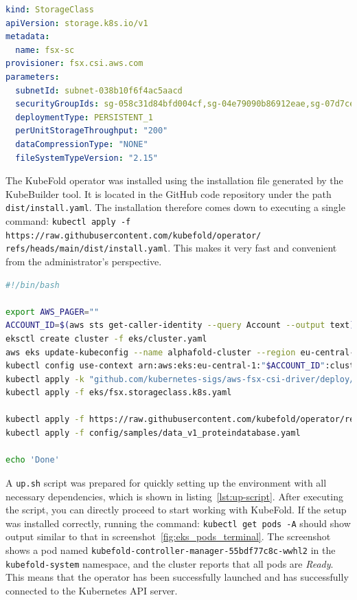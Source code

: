 \begin{lstlisting}[language=yaml,caption={Definition of \texttt{StorageClass} for FSx CSI Driver},label={lst:storage-class}]
kind: StorageClass
apiVersion: storage.k8s.io/v1
metadata:
  name: fsx-sc
provisioner: fsx.csi.aws.com
parameters:
  subnetId: subnet-038b10f6f4ac5aacd
  securityGroupIds: sg-058c31d84bfd004cf,sg-04e79090b86912eae,sg-07d7ceb3fa050568c,sg-02a2a067c7f724318
  deploymentType: PERSISTENT_1
  perUnitStorageThroughput: "200"
  dataCompressionType: "NONE"
  fileSystemTypeVersion: "2.15"
\end{lstlisting}

The KubeFold operator was installed using the installation file generated by the KubeBuilder tool.
It is located in the GitHub code repository under the path \texttt{dist/install.yaml}.
The installation therefore comes down to executing a single command: \texttt{kubectl apply -f https://raw.githubusercontent.com/kubefold/operator/ \n refs/heads/main/dist/install.yaml}.
This makes it very fast and convenient from the administrator's perspective.

\begin{lstlisting}[language=bash,caption={Quick project startup script},label={lst:up-script}]
#!/bin/bash

export AWS_PAGER=""
ACCOUNT_ID=$(aws sts get-caller-identity --query Account --output text)
eksctl create cluster -f eks/cluster.yaml
aws eks update-kubeconfig --name alphafold-cluster --region eu-central-1
kubectl config use-context arn:aws:eks:eu-central-1:"$ACCOUNT_ID":cluster/alphafold-cluster
kubectl apply -k "github.com/kubernetes-sigs/aws-fsx-csi-driver/deploy/kubernetes/overlays/stable/?ref=release-1.3"
kubectl apply -f eks/fsx.storageclass.k8s.yaml

kubectl apply -f https://raw.githubusercontent.com/kubefold/operator/refs/heads/main/dist/install.yaml
kubectl apply -f config/samples/data_v1_proteindatabase.yaml

echo 'Done'
\end{lstlisting}

A \texttt{up.sh} script was prepared for quickly setting up the environment with all necessary dependencies, which is shown in listing~\ref{lst:up-script}.
After executing the script, you can directly proceed to start working with KubeFold.
If the setup was installed correctly, running the command:\newline
\texttt{kubectl get pods -A} \newline
should show output similar to that in screenshot~\ref{fig:eks_pods_terminal}.
The screenshot shows a pod named \texttt{kubefold-controller-manager-55bdf77c8c-wwhl2} in the \texttt{kubefold-system} namespace, and the cluster reports that all pods are \textit{Ready}.
This means that the operator has been successfully launched and has successfully connected to the Kubernetes API server.

